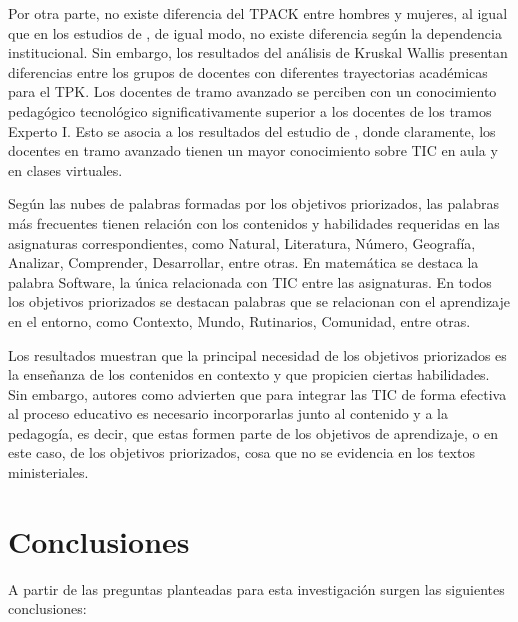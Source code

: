 \documentclass[spanish]{textolivre}
\begin{document}
Por otra parte, no existe diferencia del TPACK entre hombres y mujeres, al igual que en los estudios de \textcite{bakar_mathematics_2020,castera_self-reported_2020}, de igual modo, no existe diferencia según la dependencia institucional. Sin embargo, los resultados del análisis de Kruskal Wallis presentan diferencias entre los grupos de docentes con diferentes trayectorias académicas para el TPK. Los docentes de tramo avanzado se perciben con un conocimiento pedagógico tecnológico significativamente superior a los docentes de los tramos Experto I. Esto se asocia a los resultados del estudio de \textcite{salcedo-lagos_teachers_2021}, donde claramente, los docentes en tramo avanzado tienen un mayor conocimiento sobre TIC en aula y en clases virtuales.

Según las nubes de palabras formadas por los objetivos priorizados, las palabras más frecuentes tienen relación con los contenidos y habilidades requeridas en las asignaturas correspondientes, como Natural, Literatura, Número, Geografía, Analizar, Comprender, Desarrollar, entre otras. En matemática se destaca la palabra Software, la única relacionada con TIC entre las asignaturas. En todos los objetivos priorizados se destacan palabras que se relacionan con el aprendizaje en el entorno, como Contexto, Mundo, Rutinarios, Comunidad, entre otras.

Los resultados muestran que la principal necesidad de los objetivos priorizados es la enseñanza de los contenidos en contexto y que propicien ciertas habilidades. Sin embargo, autores como \textcite{cabero_formacion_2014,cejas_leon_competencias_2016,suarez_rodriguez_competencias_2013} advierten que para integrar las TIC de forma efectiva al proceso educativo es necesario incorporarlas junto al contenido y a la pedagogía, es decir, que estas formen parte de los objetivos de aprendizaje, o en este caso, de los objetivos priorizados, cosa que no se evidencia en los textos ministeriales.

\section{Conclusiones}\label{sec-codigos}
A partir de las preguntas planteadas para esta investigación surgen las siguientes conclusiones:
\end{document}
